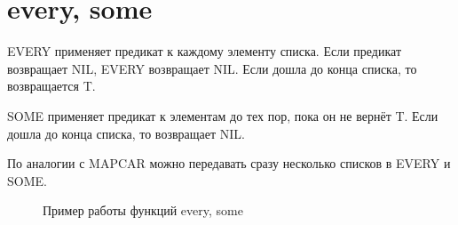 \section{every, some}

EVERY применяет предикат к каждому элементу списка. Если предикат
возвращает NIL, EVERY возвращает NIL. Если дошла до конца
списка, то возвращается T.

SOME применяет предикат к элементам до тех пор, пока он не вернёт
T. Если дошла до конца списка, то возвращает NIL.

По аналогии с MAPCAR можно передавать сразу несколько списков
в EVERY и SOME.

\begin{figure}[H]
    \begin{listingbox}{}
        
    \end{listingbox}
    \caption{Пример работы функций every, some}
    \label{lst:every-some-example}
\end{figure}